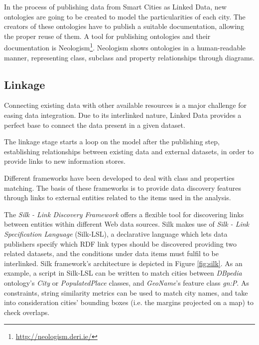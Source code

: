 In the process of publishing data from Smart Cities as Linked Data, new ontologies are going to be created to model the particularities of each city. The creators of these ontologies have to publish a suitable documentation, allowing the proper reuse of them. A tool for publishing ontologies and their documentation is Neologism\footnote{\url{http://neologism.deri.ie/}}. Neologism shows ontologies in a human-readable manner, representing class, subclass and property relationships through diagrams.

\subsection{Linkage}

Connecting existing data with other available resources is a major challenge for easing data integration. Due to its interlinked nature, Linked Data  provides a perfect base to connect the data present in a given dataset.

The linkage stage starts a loop on the model after the publishing step, establishing relationships between existing data and external datasets, in order to provide links to new information stores.

Different frameworks have been developed to deal with class and properties matching. The basis of these frameworks is to provide data discovery features through links to external entities related to the items used in the analysis.

The \textit{Silk - Link Discovery Framework} \cite{volz2009silk} offers a flexible tool for discovering links between entities within different Web data sources. Silk makes use of \textit{Silk - Link Specification Language} (Silk-LSL), a declarative language which lets data publishers specify which RDF link types should be discovered providing two related datasets, and the conditions under data items must fulfil to be interlinked. Silk framework's architecture is depicted in Figure \ref{fig:silk}. As an example, a script in Silk-LSL can be written to match cities between \textit{DBpedia} ontology's \textit{City} or \textit{PopulatedPlace} classes, and \textit{GeoName}'s feature class \textit{gn:P}. As constraints, string similarity metrics can be used to match city names, and take into consideration cities' bounding boxes (i.e. the margins projected on a map) to check overlaps.

